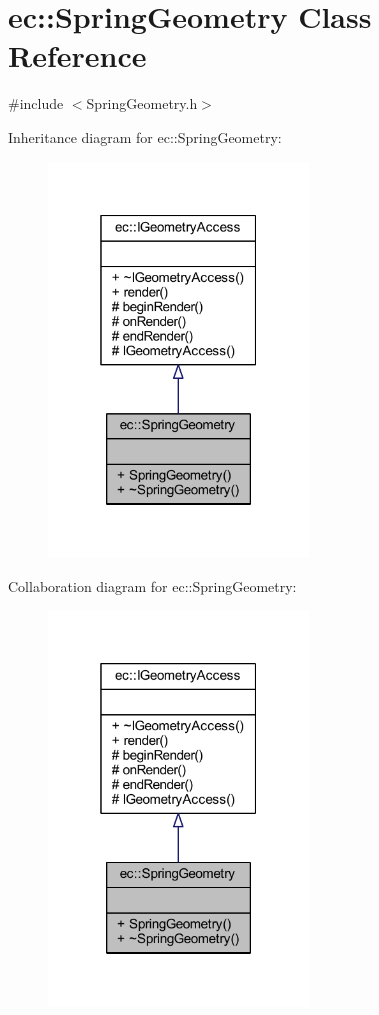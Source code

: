 \hypertarget{classec_1_1_spring_geometry}{}\section{ec\+:\+:Spring\+Geometry Class Reference}
\label{classec_1_1_spring_geometry}


{\ttfamily \#include $<$Spring\+Geometry.\+h$>$}



Inheritance diagram for ec\+:\+:Spring\+Geometry\+:\nopagebreak
\begin{figure}[H]
\begin{center}
\leavevmode
\includegraphics[width=196pt]{classec_1_1_spring_geometry__inherit__graph}
\end{center}
\end{figure}


Collaboration diagram for ec\+:\+:Spring\+Geometry\+:\nopagebreak
\begin{figure}[H]
\begin{center}
\leavevmode
\includegraphics[width=196pt]{classec_1_1_spring_geometry__coll__graph}
\end{center}
\end{figure}
